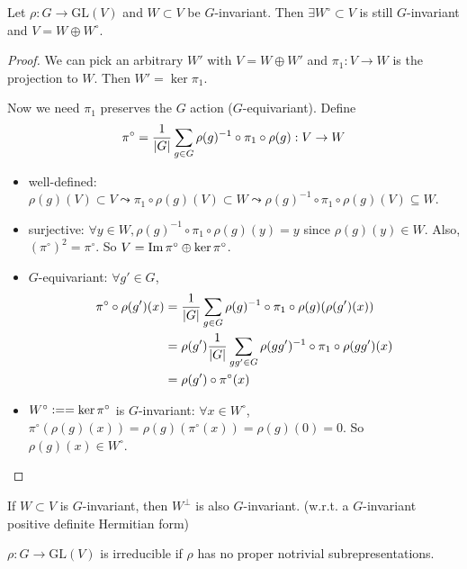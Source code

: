 \begin{theorem}
  Let $\rho: G \to \text{GL}(V)$ and $W \subset V$ be $G$-invariant.
  Then $\exists W^\circ \subset V$ is still $G$-invariant and
  $V = W \oplus W^\circ$.
  \begin{proof}
    We can pick an arbitrary $W'$ with $V = W \oplus W'$ and
    $\pi_1: V \to W$ is the projection to $W$. Then $W' = \ker \pi_1$.
    
    Now we need $\pi_1$ preserves the $G$ action ($G$-equivariant).
    Define
    \[
      \pi^\circ = \frac{1}{\lvert G\rvert} \sum_{g\in G}
      \rho(g)^{-1} \circ \pi_1 \circ \rho(g) : V \to W
    \]
    \begin{itemize}
      \item well-defined: $\rho(g)(V) \subset V \leadsto
        \pi_1 \circ \rho(g)(V) \subset W \leadsto
        \rho(g)^{-1} \circ \pi_1 \circ \rho(g)(V) \subseteq W$.
      \item surjective: $\forall y \in W,
        \rho(g)^{-1}\circ \pi_1 \circ\rho(g)(y) = y$ since
        $\rho(g)(y) \in W$. Also, $(\pi^\circ)^2 = \pi^\circ$.
        So $V = \operatorname{Im} \pi^\circ \oplus \ker \pi^\circ$.
      \item $G$-equivariant: $\forall g' \in G$,
        \begin{align*}
          \pi^\circ \circ \rho(g')(x)
          &= \frac{1}{\lvert G\rvert} \sum_{g\in G}
            \rho(g)^{-1}\circ\pi_1\circ\rho(g) (\rho(g')(x)) \\
          &= \rho(g') \frac{1}{\lvert G\rvert} \sum_{gg'\in G}
            \rho(gg')^{-1}\circ\pi_1\circ\rho(gg')(x) \\
          &= \rho(g') \circ \pi^\circ(x)
        \end{align*}
      \item $W^\circ \vcentcolon= = \ker \pi^\circ$ is $G$-invariant:
        $\forall x \in W^\circ$, $\pi^\circ(\rho(g)(x))
        = \rho(g)(\pi^\circ(x)) = \rho(g)(0) = 0$. So
        $\rho(g)(x) \in W^\circ$.
    \end{itemize}
  \end{proof}
\end{theorem}

\begin{remark}
  If $W \subset V$ is $G$-invariant, then $W^\perp$ is also $G$-invariant.
  (w.r.t. a $G$-invariant positive definite Hermitian form)
\end{remark}

\begin{definition}
  $\rho: G \to \text{GL}(V)$ is irreducible if $\rho$ has no proper notrivial
  subrepresentations.
\end{definition}

